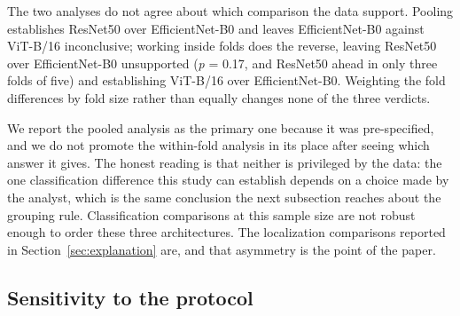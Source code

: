 \documentclass[preprint,12pt]{elsarticle}
\begin{document}
\begin{table}[t]
\centering
\caption{The same three comparisons, computed inside each fold. Holm correction is applied within the family of three, as for Table~\ref{tab:2}.}
\label{tab:4}
\small
\setlength{\tabcolsep}{4pt}
\end{table}

The two analyses do not agree about which comparison the data support. Pooling establishes ResNet50 over EfficientNet-B0 and leaves EfficientNet-B0 against ViT-B/16 inconclusive; working inside folds does the reverse, leaving ResNet50 over EfficientNet-B0 unsupported (\emph{p} = 0.17, and ResNet50 ahead in only three folds of five) and establishing ViT-B/16 over EfficientNet-B0. Weighting the fold differences by fold size rather than equally changes none of the three verdicts.

We report the pooled analysis as the primary one because it was pre-specified, and we do not promote the within-fold analysis in its place after seeing which answer it gives. The honest reading is that neither is privileged by the data: the one classification difference this study can establish depends on a choice made by the analyst, which is the same conclusion the next subsection reaches about the grouping rule. Classification comparisons at this sample size are not robust enough to order these three architectures. The localization comparisons reported in Section~\ref{sec:explanation} are, and that asymmetry is the point of the paper.

\subsection{Sensitivity to the protocol}
\label{sec:protocol}
\end{document}
